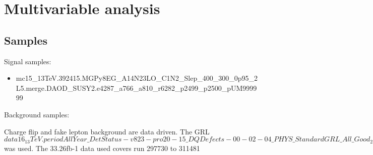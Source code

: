 \section{Multivariable analysis}

\subsection{Samples}
Signal samples:
\begin{itemize}
\item mc15\_13TeV.392415.MGPy8EG\_A14N23LO\_C1N2\_Slep\_400\_300\_0p95\_2L5.merge.DAOD\_SUSY2.e4287\_a766\_a810\_r6282\_p2499\_p2500\_pUM999999
\end{itemize}

Background samples:

Charge flip and fake lepton background are data driven. The GRL $data16_13TeV.periodAllYear\_DetStatus-v823-pro20-15\_DQDefects-00-02-04\_PHYS\_StandardGRL\_All\_Good_25ns.xml$ was used. The 33.26fb-1 data used covers run 297730 to 311481

